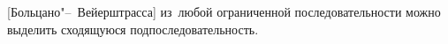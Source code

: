 [Больцано"--~Вейерштрасса]\label{b-v}
    из~любой ограниченной последовательности можно выделить сходящуюся подпоследовательность.
